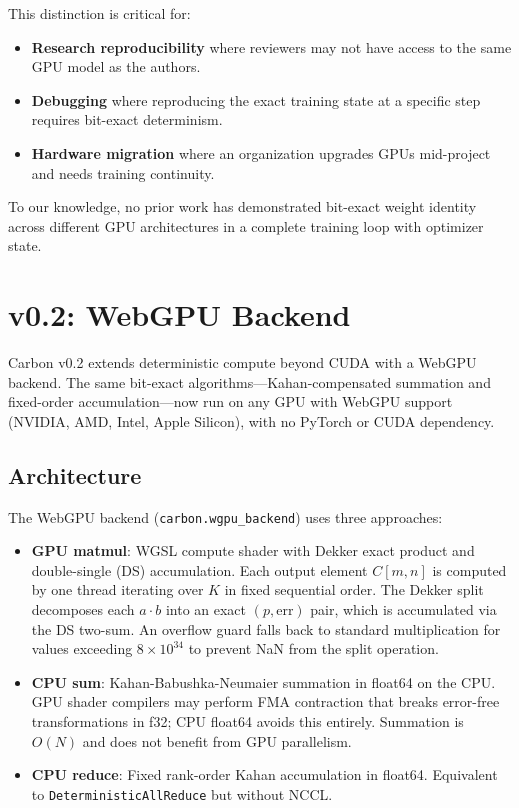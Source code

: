\documentclass[11pt,a4paper]{article}
\begin{document}
This distinction is critical for:

\begin{itemize}
  \item \textbf{Research reproducibility} where reviewers may not have access
    to the same GPU model as the authors.
  \item \textbf{Debugging} where reproducing the exact training state at a
    specific step requires bit-exact determinism.
  \item \textbf{Hardware migration} where an organization upgrades GPUs
    mid-project and needs training continuity.
\end{itemize}

To our knowledge, no prior work has demonstrated bit-exact weight identity
across different GPU architectures in a complete training loop with optimizer
state.

\section{v0.2: WebGPU Backend}

Carbon v0.2 extends deterministic compute beyond CUDA with a WebGPU backend.
The same bit-exact algorithms---Kahan-compensated summation and fixed-order
accumulation---now run on any GPU with WebGPU support (NVIDIA, AMD, Intel,
Apple Silicon), with no PyTorch or CUDA dependency.

\subsection{Architecture}

The WebGPU backend (\texttt{carbon.wgpu\_backend}) uses three approaches:

\begin{itemize}
  \item \textbf{GPU matmul}: WGSL compute shader with Dekker exact product
    and double-single (DS) accumulation. Each output element $C[m,n]$ is
    computed by one thread iterating over $K$ in fixed sequential order.
    The Dekker split decomposes each $a \cdot b$ into an exact $(p, \text{err})$
    pair, which is accumulated via the DS two-sum. An overflow guard falls back
    to standard multiplication for values exceeding $8 \times 10^{34}$ to
    prevent NaN from the split operation.
  \item \textbf{CPU sum}: Kahan-Babushka-Neumaier summation in float64 on the
    CPU. GPU shader compilers may perform FMA contraction that breaks
    error-free transformations in f32; CPU float64 avoids this entirely.
    Summation is $O(N)$ and does not benefit from GPU parallelism.
  \item \textbf{CPU reduce}: Fixed rank-order Kahan accumulation in float64.
    Equivalent to \texttt{DeterministicAllReduce} but without NCCL.
\end{itemize}
\end{document}
